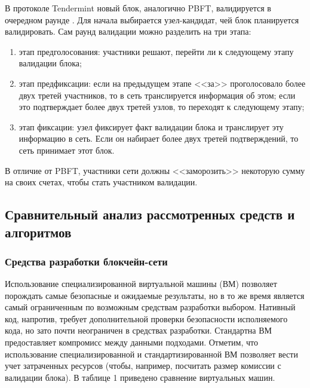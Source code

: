 В протоколе Tendermint новый блок, аналогично PBFT, валидируется в очередном раунде \cite{tendermint}. Для начала выбирается узел-кандидат, чей блок планируется валидировать. Сам раунд валидации можно разделить на три этапа:
\begin{enumerate}[leftmargin=1.6\parindent]
	\item этап предголосования: участники решают, перейти ли к следующему этапу валидации блока;
	\item этап предфиксации: если на предыдущем этапе <<за>> проголосовало более двух третей участников, то в сеть транслируется информация об этом; если это подтверждает более двух третей узлов, то переходят к следующему этапу;
	\item этап фиксации: узел фиксирует факт валидации блока и транслирует эту информацию в сеть. Если он набирает более двух третей подтверждений, то сеть принимает этот блок.
\end{enumerate}

В отличие от PBFT, участники сети должны <<заморозить>> некоторую сумму на своих счетах, чтобы стать участником валидации.


\subsection{Сравнительный анализ рассмотренных средств и алгоритмов}

\subsubsection{Средства разработки блокчейн-сети}

Использование специализированной виртуальной машины (ВМ) позволяет порождать самые безопасные и ожидаемые результаты, но в то же время является самый ограниченным по возможным средствам разработки выбором. Нативный код, напротив, требует дополнительной проверки безопасности исполняемого кода, но зато почти неограничен в средствах разработки. Стандартна ВМ предоставляет компромисс между данными подходами. Отметим, что использование специализированной и стандартизированной ВМ позволяет вести учет затраченных ресурсов (чтобы, например, посчитать размер комиссии с валидации блока). В таблице 1 приведено сравнение виртуальных машин.

\begin{table}[h!]
	\captionsetup{justification=raggedleft,singlelinecheck=off}
	\caption{Сравнение вирутальных машин}
\end{table}


